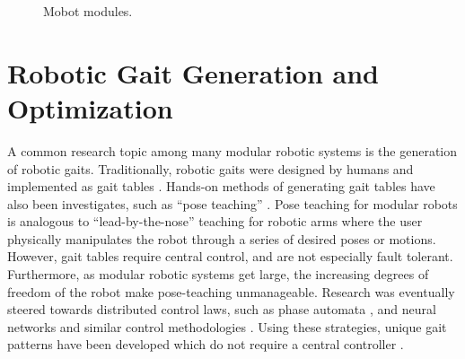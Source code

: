     \begin{figure}[!ht]
    \begin{center}
    \end{center}
    \caption{\label{fig:mobot_modules}Mobot modules.}
    \end{figure}

  \section{Robotic Gait Generation and Optimization} %
    A common research topic among many modular robotic systems is the
      generation of robotic gaits. 
    Traditionally, robotic gaits were designed by humans and implemented as
      gait tables \cite{Yim2000, Kamimura2001}. 
    Hands-on methods of generating gait tables have also been investigates,
      such as ``pose teaching'' \cite{Ryland2010}. 
    Pose teaching for modular robots is analogous to ``lead-by-the-nose''
      teaching for robotic arms where the user physically manipulates the robot
      through a series of desired poses or motions.  
    However, gait tables require central control, and are not especially fault
      tolerant. 
    Furthermore, as modular robotic systems get large, the increasing degrees
      of freedom of the robot make pose-teaching unmanageable. 
    Research was eventually steered towards distributed control laws, such as
      phase automata \cite{Zhang2003}, and neural networks and similar control
      methodologies \cite{Canavier1997, Inagaki2006, Derosa2008}. 
    Using these strategies, unique gait patterns have been developed which do
      not require a central controller \cite{Sastra2009}.


